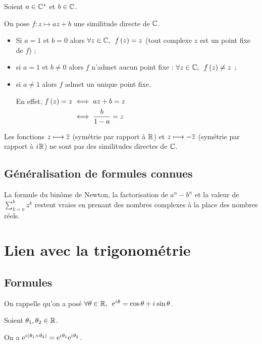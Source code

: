 \begin{rem}
Soient \(a\in\mathbb{C}^*\) et \(b\in\mathbb{C}\).

On pose \(f:z\mapsto az+b\) une similitude directe de \(\mathbb{C}\).

\begin{itemize}
\item Si \(a=1\) et \(b=0\) alors \(\quantifs{\forall z\in\C}f\paren{z}=z\) (tout complexe \(z\) est un point fixe de \(f\)) ;

\item si \(a=1\) et \(b\not=0\) alors \(f\) n'admet aucun point fixe : \(\quantifs{\forall z\in\C}f\paren{z}\not=z\) ;

\item si \(a\not=1\) alors \(f\) admet un unique point fixe.

En effet, \(\begin{aligned}[t]
f\left(z\right)=z&\iff az+b=z \\
&\iff\dfrac{b}{1-a}=z
\end{aligned}\)
\end{itemize}
\end{rem}

\begin{rem}
Les fonctions \(z\longmapsto\overline{z}\) (symétrie par rapport à \(\mathbb{R}\)) et \(z\longmapsto-\overline{z}\) (symétrie par rapport à \(i\mkern1mu\mathbb{R}\)) ne sont pas des similitudes directes de \(\mathbb{C}\).
\end{rem}

\subsection{Généralisation de formules connues}

La formule du binôme de Newton, la factorisation de \(a^n-b^n\) et la valeur de \(\sum_{k=a}^b z^k\) restent vraies en prenant des nombres complexes à la place des nombres réels.

\section{Lien avec la trigonométrie}

\subsection{Formules}

On rappelle qu'on a posé \(\quantifs{\forall\theta\in\R}\e{\i\theta}=\cos\theta+\i\sin\theta\).

\begin{prop}
Soient \(\theta_1,\theta_2\in\mathbb{R}\).

On a \(\mathrm{e}^{i\mkern1mu\left(\theta_1+\theta_2\right)}=\mathrm{e}^{i\mkern1mu\theta_1}\mathrm{e}^{i\mkern1mu\theta_2}\).
\end{prop}

